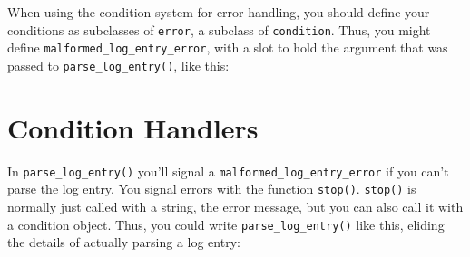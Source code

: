 \begin{Shaded}
\begin{Highlighting}[]
\StringTok{ } \NormalTok{(-}
  \NormalTok{(}
     \NormalTok{),}
    \NormalTok{(}  
  \NormalTok{)}
\NormalTok{\}}
\end{Highlighting}
\end{Shaded}

When using the condition system for error handling, you should define
your conditions as subclasses of \texttt{error}, a subclass of
\texttt{condition}. Thus, you might define
\texttt{malformed\_log\_entry\_error}, with a slot to hold the argument
that was passed to \texttt{parse\_log\_entry()}, like this:

\begin{Shaded}
\begin{Highlighting}[]
\StringTok{ }
  \StringTok{ }\NormalTok{(}
  \NormalTok{(}\NormalTok{(}\NormalTok{, }\NormalTok{),}
     
     
  \NormalTok{)}
\NormalTok{\}}
\end{Highlighting}
\end{Shaded}

\section{Condition Handlers}

In \texttt{parse\_log\_entry()} you'll signal a
\texttt{malformed\_log\_entry\_error} if you can't parse the log entry.
You signal errors with the function \texttt{stop()}. \texttt{stop()} is
normally just called with a string, the error message, but you can also
call it with a condition object. Thus, you could write
\texttt{parse\_log\_entry()} like this, eliding the details of actually
parsing a log entry:

\begin{Shaded}
\begin{Highlighting}[]
\StringTok{ }
    \NormalTok{(}
  \NormalTok{\}}
  
\NormalTok{\}}
\end{Highlighting}
\end{Shaded}

